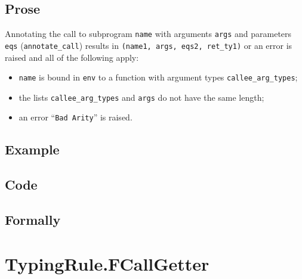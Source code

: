 \documentclass{book}
\begin{document}
  \subsection{Prose} 
  Annotating the call to subprogram \texttt{name} with arguments \texttt{args}
and parameters \texttt{eqs} (\texttt{annotate\_call}) results in
\texttt{(name1, args, eqs2, ret\_ty1)} or an error is raised and all of the
following apply:
   \begin{itemize}
   \item \texttt{name} is bound in \texttt{env} to a function with argument types \texttt{callee\_arg\_types};
   \item the lists \texttt{callee\_arg\_types} and \texttt{args} do not have the same length;
   \item an error ``\texttt{Bad Arity}'' is raised.
   \end{itemize}

  \subsection{Example}

  \subsection{Code}

\begin{emptyformal}
    \subsection{Formally}
\end{emptyformal}


\section{TypingRule.FCallGetter \label{sec:TypingRule.FCallGetter}}
\end{document}
